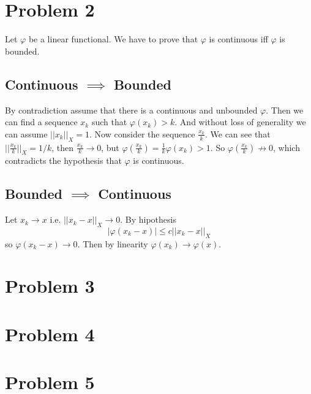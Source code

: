 \documentclass{article}
\begin{document}
\section*{Problem 2}
Let $\varphi$ be a linear functional. We have to prove that $\varphi$ is continuous
iff $\varphi$ is bounded.
\subsection*{Continuous $\implies$ Bounded}
By contradiction assume that there is a continuous and unbounded $\varphi$.
Then we can find a sequence $x_k$ such that $\varphi(x_k)>k$. And without loss
of generality we can assume $||x_k||_X=1$. Now consider the sequence
$\frac{x_k}{k}$. We can see that $||\frac{x_k}{k}||_X=1/k$, then $\frac{x_k}{k}
\to 0$, but $\varphi(\frac{x_k}{k})=\frac{1}{k}\varphi(x_k)>1$. So
$\varphi(\frac{x_k}{k}) \not \to 0$, which contradicts the hypothesis that
$\varphi$ is continuous.
\subsection*{Bounded $\implies$ Continuous}
Let $x_k \to x$ i.e. $||x_k-x||_X \to 0$. By hipothesis
\[
	|\varphi(x_k-x)|\leq c ||x_k-x||_X
\]
so $\varphi(x_k-x) \to 0$. Then by linearity $\varphi(x_k)\to \varphi(x)$.

\section*{Problem 3}
\section*{Problem 4}
\section*{Problem 5}
\end{document}
